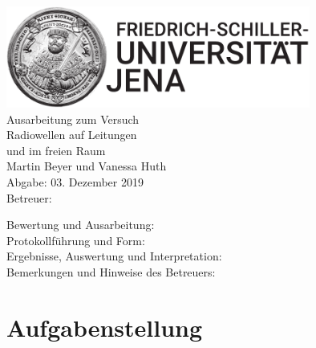 \documentclass[a4paper,twoside,final]{article}
\begin{document}
\setlength{\marginparsep}{2em}
\renewcommand{\theequation}{\arabic{section}.\arabic{equation}}
\renewcommand{\thefigure}{\arabic{section}.\arabic{figure}}
\renewcommand{\thetable}{\arabic{section}.\arabic{table}}

\begin{center}
\thispagestyle{empty}
  \includegraphics[width=0.75\textwidth]{../UniJena_BildWortMarke_black.pdf}\\[4em]
  \Large
  Ausarbeitung zum Versuch\\[2em]
  \Huge
  Radiowellen auf Leitungen\\
  und im freien Raum\\
  \vspace{2cm}
  \Large
  Martin Beyer und Vanessa Huth\\[2em]
  Abgabe: 03. Dezember 2019\\[2em]
  Betreuer: \\[5em]
  \begin{flushleft}
  	Bewertung und Ausarbeitung:\\[2em]
		Protokollführung und Form:\\[1em]
		Ergebnisse, Auswertung und Interpretation:\\[1em]
		Bemerkungen und Hinweise des Betreuers:
  \end{flushleft}
\end{center}
\clearpage

\pagestyle{fancy}
\renewcommand{\headrulewidth}{0pt}
\renewcommand{\footrulewidth}{0.5pt}
\renewcommand{\sectionmark}[1]{\markright{#1}}
\fancyhead[RE,LO]{\rightmark}
\fancyfoot[LE,RO]{\bfseries\thepage}
\renewcommand{\headrulewidth}{0.5pt}
\renewcommand{\footrulewidth}{0.5pt}

\setcounter{equation}{0}
\setcounter{figure}{0}

\tableofcontents
\newpage
\section{Aufgabenstellung} \label{sec:Aufgabenstellung}
\end{document}
